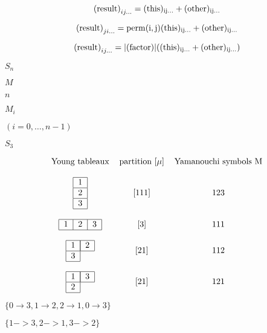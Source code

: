 \documentclass{article}
\begin{document}
\[ {(\rm{result})}_{ij...} = (\rm{this})_{ij...} + (\rm{other})_{ij...} \]
\pagebreak

\[ {(\rm{result})}_{ji...} = \rm{perm}(i,j) (\rm{this})_{ij...} + (\rm{other})_{ij...} \]
\pagebreak

\[ {(\rm{result})}_{ij...} = |(\rm{factor})| ((\rm{this})_{ij...} + (\rm{other})_{ij...}) \]
\pagebreak

$ S_n $
\pagebreak

$ M $
\pagebreak

$ n $
\pagebreak

$ M_i $
\pagebreak

$ (i = 0, \dots , n-1) $
\pagebreak

$ S_3 $
\pagebreak

\[ \begin{tabular}{ c c c } Young tableaux & partition [$\mu$] & Yamanouchi symbols M \\ & & \\ \begin{tabular}{ |c| } \hline 1 \\ \hline 2 \\ \hline 3 \\ \hline \end{tabular} & [111] & 123 \\ & & \\ \begin{tabular}{ |c|c|c| } \hline 1 & 2 & 3 \\ \hline \end{tabular} & [3] & 111 \\ & & \\ \begin{tabular}{ |c|c } \hline 1 & \multicolumn{1}{|c|}{2} \\ \hline 3 \\ \cline{1-1} \end{tabular} & [21] & 112 \\ & & \\ \begin{tabular}{ |c|c } \hline 1 & \multicolumn{1}{|c|}{3} \\ \hline 2 \\ \cline{1-1} \end{tabular} & [21] & 121 \\ \end{tabular} \]
\pagebreak

$ \{0 \to 3, 1 \to 2, 2 \to 1, 0 \to 3 \} $
\pagebreak

$ \{1->3, 2->1, 3->2\} $
\pagebreak
\end{document}
